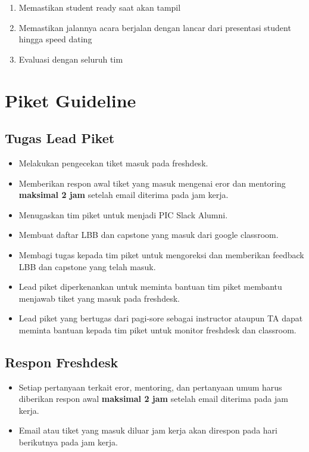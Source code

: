 \documentclass[
]{book}
\providecommand{\tightlist}{%
  \setlength{\itemsep}{0pt}\setlength{\parskip}{0pt}}
\begin{document}
\begin{enumerate}
\def\labelenumi{\arabic{enumi}.}
\tightlist
\item
  Memastikan student ready saat akan tampil
\item
  Memastikan jalannya acara berjalan dengan lancar dari presentasi student hingga speed dating
\item
  Evaluasi dengan seluruh tim
\end{enumerate}

\hypertarget{piket-guideline}{%
\chapter{Piket Guideline}\label{piket-guideline}}

\hypertarget{tugas-lead-piket}{%
\section{Tugas Lead Piket}\label{tugas-lead-piket}}

\begin{itemize}
\tightlist
\item
  Melakukan pengecekan tiket masuk pada freshdesk.
\item
  Memberikan respon awal tiket yang masuk mengenai eror dan mentoring \textbf{maksimal 2 jam} setelah email diterima pada jam kerja.
\item
  Menugaskan tim piket untuk menjadi PIC Slack Alumni.
\item
  Membuat daftar LBB dan capstone yang masuk dari google classroom.
\item
  Membagi tugas kepada tim piket untuk mengoreksi dan memberikan feedback LBB dan capstone yang telah masuk.
\item
  Lead piket diperkenankan untuk meminta bantuan tim piket membantu menjawab tiket yang masuk pada freshdesk.
\item
  Lead piket yang bertugas dari pagi-sore sebagai instructor ataupun TA dapat meminta bantuan kepada tim piket untuk monitor freshdesk dan classroom.
\end{itemize}

\hypertarget{respon-freshdesk}{%
\section{Respon Freshdesk}\label{respon-freshdesk}}

\begin{itemize}
\tightlist
\item
  Setiap pertanyaan terkait eror, mentoring, dan pertanyaan umum harus diberikan respon awal \textbf{maksimal 2 jam} setelah email diterima pada jam kerja.
\item
  Email atau tiket yang masuk diluar jam kerja akan direspon pada hari berikutnya pada jam kerja.
\end{itemize}
\end{document}
